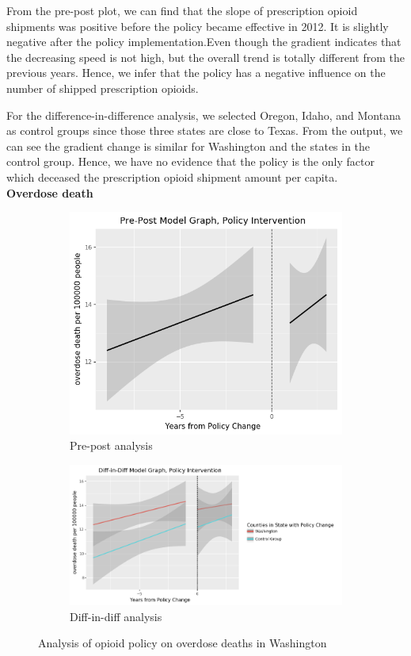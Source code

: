 \documentclass[12pt,letterpaper]{article}
\begin{document}
From the pre-post plot, we can find that the slope of prescription opioid shipments was positive before the policy became effective in 2012. It is slightly negative after the policy implementation.Even though the gradient indicates that the decreasing speed is not high, but the overall trend is totally different from the previous years. Hence, we infer that the policy has a negative influence on the number of shipped prescription opioids.

For the difference-in-difference analysis, we selected Oregon, Idaho, and Montana as control groups since those three states are close to Texas. From the output, we can see the gradient change is similar for Washington and the states in the control group. Hence, we have no evidence that the policy is the only factor which deceased the prescription opioid shipment amount per capita. \\

\noindent \textbf{Overdose death}

\begin{figure}[!h]
\centering
\begin{subfigure}{.5\textwidth}
  \centering
  \includegraphics[width=0.7\linewidth]{../30_results/General_Results/washington_overdose_death_prepost.png}
  \caption{Pre-post analysis}
  \label{fig:wa_death_prepost}
\end{subfigure}%
\begin{subfigure}{.55\textwidth}
  \centering
  \includegraphics[width=1\linewidth]{../30_results/General_Results/washington_overdose_death_diffdiff.png}
  \caption{Diff-in-diff analysis}
  \label{fig:wa_death_did}
\end{subfigure}
\caption{Analysis of opioid policy on overdose deaths in Washington}
\label{fig:wa_death}
\end{figure}
\end{document}
